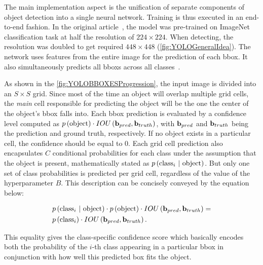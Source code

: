 The main implementation aspect is the unification of separate components of object detection into a single neural network. Training is thus executed in an end-to-end fashion. In the original article~\cite{Redmon2016}, the model was pre-trained on ImageNet~\cite{imagenet_cvpr09} classification task at half the resolution of $224 \times 224$. When detecting, the resolution was doubled to get required $448 \times 448$ (\cref{fig:YOLOGeneralIdea}). The network uses features from the entire image for the prediction of each \gls{bbox}. It also simultaneously predicts all \glspl{bbox} across all classes~\cite{Redmon2016}.

As shown in the \cref{fig:YOLOBBOXESProgression}, the input image is divided into an $S \times S$ grid. Since most of the time an object will overlap multiple grid cells, the \emph{main} cell responsible for predicting the object will be the one the center of the object's \gls{bbox} falls into. Each \gls{bbox} prediction is evaluated by a confidence level computed as $p \left( \text{object} \right) \cdot {IOU} \left( \mathbf{b}_{pred}, \mathbf{b}_{truth} \right)$, with $\mathbf{b}_{pred}$ and $\mathbf{b}_{truth}$ being the prediction and ground truth, respectively. If no object exists in a particular cell, the confidence should be equal to $0$. Each grid cell prediction also encapsulates $C$ conditional probabilities for each class under the assumption that the object is present, mathematically stated as $p \left( {\text{class}}_i \ | \ \text{object} \right)$. But only one set of class probabilities is predicted per grid cell, regardless of the value of the hyperparameter $B$. This description can be concisely conveyed by the equation below:

\begin{equation}
    \begin{aligned}
        \label{eq:YOLOCOnfidenceScores}
        &p \left( {\text{class}}_i \ | \ \text{object} \right)
        \cdot
        p \left( \text{object} \right)
        \cdot
        {IOU} \left( \mathbf{b}_{pred}, \mathbf{b}_{truth} \right)
        =\\
        &p \left( {\text{class}}_i \right)
        \cdot
        {IOU} \left( \mathbf{b}_{pred}, \mathbf{b}_{truth} \right).
    \end{aligned}
\end{equation}

\noindent This equality gives the class-specific confidence score which basically encodes both the probability of the $i$-th class appearing in a particular \gls{bbox} in conjunction with how well this predicted box fits the object.

